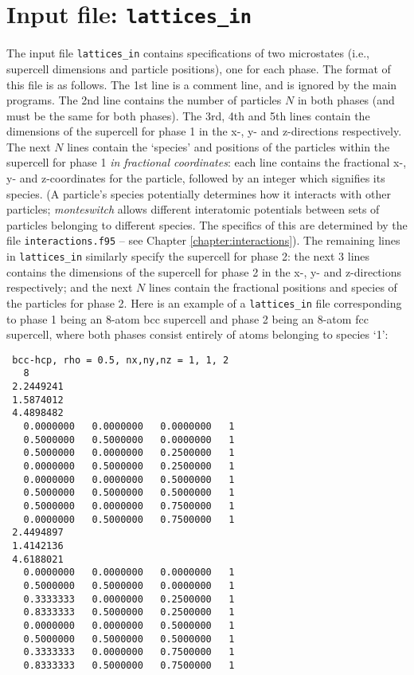 \documentclass{report}
\begin{document}
\section{Input file: \texttt{lattices\_in}}
The input file \texttt{lattices\_in} contains specifications of two microstates (i.e., supercell dimensions and particle positions), one for
each phase. The format of this file is as follows. The 1st line is a comment line, and is ignored by the main programs. The 2nd line contains
the number of particles $N$ in both phases (and must be the same for both phases). The 3rd, 4th and 5th lines contain the dimensions of the
supercell for phase 1 in the x-, y- and z-directions respectively. The next $N$ lines contain the `species' and positions of the particles within 
the supercell for phase 1 \emph{in fractional coordinates}: each line contains the fractional x-, y- and z-coordinates for the particle, followed 
by an integer which signifies its species. (A particle's species potentially determines how it interacts with other particles; \emph{monteswitch} 
allows different interatomic potentials between sets of particles belonging to different species. The specifics of this are determined by the file 
\texttt{interactions.f95} -- see Chapter \ref{chapter:interactions}). The remaining lines in \texttt{lattices\_in} similarly specify the supercell 
for phase 2: the next 3 lines contains the dimensions of the supercell for phase 2 in the x-, y- and z-directions respectively; and the next $N$ 
lines contain the fractional positions and species of the particles for phase 2.
Here is an example of a \texttt{lattices\_in} file corresponding to phase 1 being an 8-atom bcc supercell and phase 2 being an 8-atom fcc supercell,
where both phases consist entirely of atoms belonging to species `1':
\begin{verbatim}
 bcc-hcp, rho = 0.5, nx,ny,nz = 1, 1, 2
   8
 2.2449241     
 1.5874012     
 4.4898482
   0.0000000   0.0000000   0.0000000   1
   0.5000000   0.5000000   0.0000000   1
   0.5000000   0.0000000   0.2500000   1
   0.0000000   0.5000000   0.2500000   1
   0.0000000   0.0000000   0.5000000   1
   0.5000000   0.5000000   0.5000000   1
   0.5000000   0.0000000   0.7500000   1
   0.0000000   0.5000000   0.7500000   1
 2.4494897     
 1.4142136     
 4.6188021     
   0.0000000   0.0000000   0.0000000   1
   0.5000000   0.5000000   0.0000000   1
   0.3333333   0.0000000   0.2500000   1
   0.8333333   0.5000000   0.2500000   1
   0.0000000   0.0000000   0.5000000   1
   0.5000000   0.5000000   0.5000000   1
   0.3333333   0.0000000   0.7500000   1
   0.8333333   0.5000000   0.7500000   1
\end{verbatim}
\end{document}
